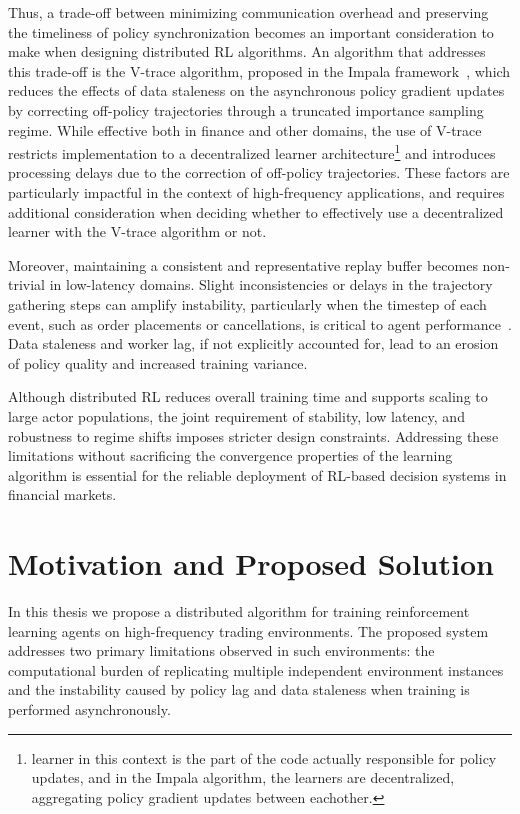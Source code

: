 Thus, a trade-off between minimizing communication overhead and preserving the timeliness of policy synchronization
becomes an important consideration to make when designing distributed RL algorithms.
An algorithm that addresses this trade-off is the V-trace algorithm, proposed in the Impala framework~\citep{Espeholt2018},
which reduces the effects of data staleness on the asynchronous policy gradient updates by
correcting off-policy trajectories through a truncated importance sampling regime.
While effective both in finance and other domains,
the use of V-trace restricts implementation to a decentralized learner architecture\footnote{
    learner in this context is the part of the code actually responsible for policy updates,
    and in the Impala algorithm, the learners are decentralized, aggregating policy gradient updates between eachother.
} and introduces processing delays due to the correction of off-policy trajectories.
These factors are particularly impactful in the context of high-frequency applications,
and requires additional consideration when deciding whether to effectively use a decentralized learner with the V-trace algorithm or not.

Moreover, maintaining a consistent and representative replay buffer becomes non-trivial in low-latency domains.
Slight inconsistencies or delays in the trajectory gathering steps can amplify instability,
particularly when the timestep of each event, such as order placements or cancellations, is critical to agent performance~\citep{Zhang2024, Kopic2024}.
Data staleness and worker lag, if not explicitly accounted for, lead to an erosion of policy quality and increased training variance.

Although distributed RL reduces overall training time and supports scaling to large actor populations,
the joint requirement of stability, low latency, and robustness to regime shifts imposes stricter design constraints.
Addressing these limitations without sacrificing the convergence properties of the learning algorithm is essential
for the reliable deployment of RL-based decision systems in financial markets.

\section{Motivation and Proposed Solution}
\label{sec:motivation}

In this thesis we propose a distributed algorithm for training reinforcement learning agents on high-frequency trading environments.
The proposed system addresses two primary limitations observed in such environments:
the computational burden of replicating multiple independent environment instances and the instability caused by
policy lag and data staleness when training is performed asynchronously.

